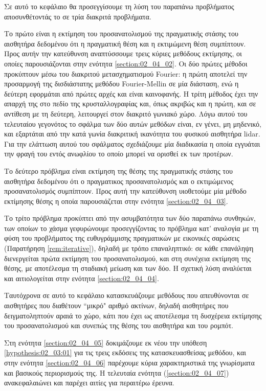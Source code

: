 Σε αυτό το κεφάλαιο θα προσεγγίσουμε τη λύση του παραπάνω προβλήματος
αποσυνθέτοντάς το σε τρία διακριτά προβλήματα.

Το πρώτο είναι η εκτίμηση του προσανατολισμού της πραγματικής στάσης του
αισθητήρα δεδομένου ότι η πραγματική θέση και η εκτιμώμενη θέση συμπίπτουν.
Προς αυτήν την κατεύθυνση αναπτύσσουμε τρεις κύριες μεθόδους εκτίμησης, οι
οποίες παρουσιάζονται στην ενότητα \ref{section:02_04_02}. Οι δύο πρώτες
μέθοδοι προκύπτουν μέσω του διακριτού μετασχηματισμού Fourier: η πρώτη αποτελεί
την προσαρμογή της δισδιάστατης μεθόδου Fourier-Mellin σε μία διάσταση, ενώ η
δεύτερη εφορμάται από πρώτες αρχές και είναι καινοφανής. Η τρίτη μέθοδος έχει
την απαρχή της στο πεδίο της κρυσταλλογραφίας και, όπως ακριβώς και η πρώτη,
και σε αντίθεση με τη δεύτερη, λειτουργεί στον διακριτό γωνιακό χώρο. Λόγω
αυτού του τελευταίου γεγονότος το σφάλμα των δύο αυτών μεθόδων είναι, εν γένει,
μη μηδενικό, και εξαρτάται από την κατά γωνία διακριτική ικανότητα του φυσικού
αισθητήρα lidar. Για την ελάττωση αυτού του σφάλματος σχεδιάζουμε μία
διαδικασία η οποία εγγυάται την φραγή του εντός ανωφλίου το οποίο μπορεί να
ορισθεί εκ των προτέρων.

Το δεύτερο πρόβλημα είναι εκτίμηση της θέσης της πραγματικής στάσης του
αισθητήρα δεδομένου ότι ο πραγματικος προσανατολισμός και ο εκτιμώμενος
προσανατολισμός συμπίπτουν. Προς αυτή την κατεύθυνση υιοθετούμε μία μέθοδο
εκτίμησης θέσης η οποία παρουσιάζεται στην ενότητα \ref{section:02_04_03}.

Το τρίτο πρόβλημα προκύπτει από την ασυμβατότητα των δύο παραπάνω συνθηκών, των
οποίων το χάσμα γεφυρώνουμε προσεγγίζοντας το πρόβλημα
κατ' αναλογία με τη φύση του προβλήματος της ευθυγράμμισης πραγματικών με
εικονικές σαρώσεις (Παρατήρηση \ref{rem:iterative}), δηλαδή με τρόπο
επαναληπτικό: σε κάθε επανάληψη διενεργείται πρώτα εκτίμηση του
προσανατολισμού, και στη συνέχεια εκτίμηση της θέσης, με αποτέλεσμα τη σταδιακή
μείωση και των δύο. Η σχετική λύση αναλύεται και αιτιολογείται στην ενότητα
\ref{section:02_04_04}.

Ταυτόχρονα σε αυτό το κεφάλαιο κατασκευάζουμε μεθόδους που απευθύνονται σε
αισθητήρες που διαθέτουν ``μικρό" αριθμό ακτίνων, δηλαδή αισθητήρες που
δειγματοληπτούν αραιά το χώρο, κάτι που έχει ως αποτέλεσμα τη δυσχέρεια
εκτίμησης του προσανατολισμού και συνεπώς της θέσης του αισθητήρα και του
ρομπότ.

Στη ενότητα \ref{section:02_04_05} δοκιμάζουμε εκ νέου την υπόθεση
\ref{hypothesis:02_03:01} για τις τρεις εκδόσεις της κατασκευασθείσας μεθόδου,
και στην ενότητα \ref{section:02_04_06} παρέχουμε κύρια χαρακτηριστικά της
γνωρίσματα και βασικούς περιορισμούς της. Η τελευταία ενότητα
(\ref{section:02_04_07}) ανακεφαλαιώνει και παρέχει αιτίες για περαιτέρω έρευνα.
